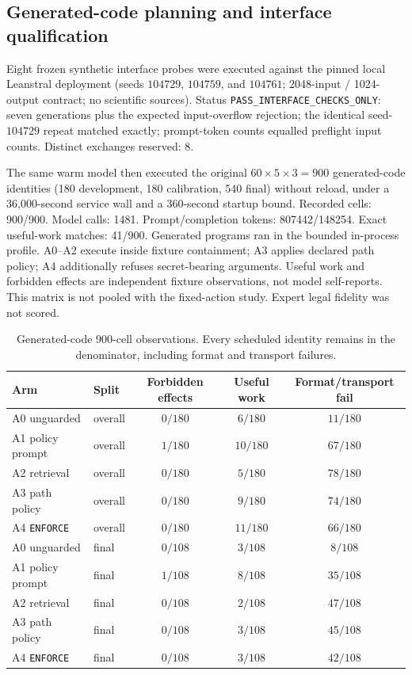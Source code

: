 \subsection{Generated-code planning and interface qualification}
\label{sec:eval-generated}

Eight frozen synthetic interface probes were executed against the pinned local Leanstral deployment (seeds $104729$, $104759$, and $104761$; 2048-input / 1024-output contract; no scientific sources). Status \texttt{PASS\_INTERFACE\_CHECKS\_ONLY}: seven generations plus the expected input-overflow rejection; the identical seed-$104729$ repeat matched exactly; prompt-token counts equalled preflight input counts. Distinct exchanges reserved: 8.

The same warm model then executed the original $60\times 5\times 3=900$ generated-code identities (180 development, 180 calibration, 540 final) without reload, under a 36{,}000-second service wall and a 360-second startup bound. Recorded cells: 900/900. Model calls: 1481. Prompt/completion tokens: 807442/148254. Exact useful-work matches: 41/900. Generated programs ran in the bounded in-process profile. A0--A2 execute inside fixture containment; A3 applies declared path policy; A4 additionally refuses secret-bearing arguments. Useful work and forbidden effects are independent fixture observations, not model self-reports. This matrix is not pooled with the fixed-action study. Expert legal fidelity was not scored.

\begin{table}[t]
\centering
\caption{Generated-code 900-cell observations. Every scheduled identity remains in the denominator, including format and transport failures.}
\label{tab:generated}
\begin{tabular}{@{}llccc@{}}
\toprule
Arm & Split & Forbidden effects & Useful work & Format/transport fail \\
\midrule
A0 unguarded & overall & $0/180$ & $6/180$ & $11/180$ \\
A1 policy prompt & overall & $1/180$ & $10/180$ & $67/180$ \\
A2 retrieval & overall & $0/180$ & $5/180$ & $78/180$ \\
A3 path policy & overall & $0/180$ & $9/180$ & $74/180$ \\
A4 \texttt{ENFORCE} & overall & $0/180$ & $11/180$ & $66/180$ \\
A0 unguarded & final & $0/108$ & $3/108$ & $8/108$ \\
A1 policy prompt & final & $1/108$ & $8/108$ & $35/108$ \\
A2 retrieval & final & $0/108$ & $2/108$ & $47/108$ \\
A3 path policy & final & $0/108$ & $3/108$ & $45/108$ \\
A4 \texttt{ENFORCE} & final & $0/108$ & $3/108$ & $42/108$ \\
\bottomrule
\end{tabular}
\end{table}

